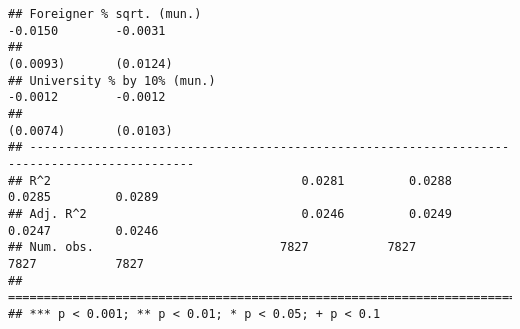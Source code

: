 \documentclass[
]{article}
\begin{document}
\begin{verbatim}
## Foreigner % sqrt. (mun.)                                           -0.0150        -0.0031    
##                                                                    (0.0093)       (0.0124)   
## University % by 10% (mun.)                                         -0.0012        -0.0012    
##                                                                    (0.0074)       (0.0103)   
## ---------------------------------------------------------------------------------------------
## R^2                                   0.0281         0.0288         0.0285         0.0289    
## Adj. R^2                              0.0246         0.0249         0.0247         0.0246    
## Num. obs.                          7827           7827           7827           7827         
## =============================================================================================
## *** p < 0.001; ** p < 0.01; * p < 0.05; + p < 0.1
\end{verbatim}
\end{document}
